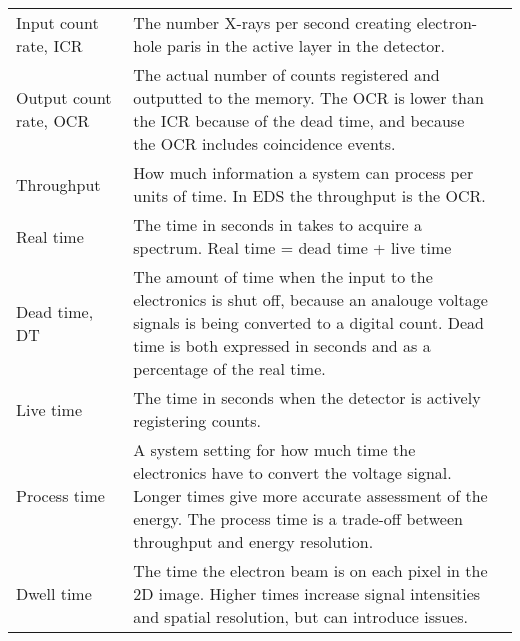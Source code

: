 \begin{table}[pht]
\begin{center}
\begin{tabular}{p{2.6cm}p{10cm}l}
            Input count rate, ICR             & The number X-rays per second creating electron-hole paris in the active layer in the detector.                                                                                                                             &                    \\
            Output count rate, OCR            & The actual number of counts registered and outputted to the memory. The OCR is lower than the ICR because of the dead time, and because the OCR includes coincidence events.                                               &                    \\
            Throughput                        & How much information a system can process per units of time. In EDS the throughput is the OCR.                                                                                                                             &                    \\
            Real time                         & The time in seconds in takes to acquire a spectrum. Real time = dead time + live time                                                                                                                                      &                    \\
            Dead time, DT                     & The amount of time when the input to the electronics is shut off, because an analouge voltage signals is being converted to a digital count. Dead time is both expressed in seconds and as a percentage of the real time.  &                    \\
            Live time                         & The time in seconds when the detector is actively registering counts.                                                                                                                                                      &                    \\
            Process time                      & A system setting for how much time the electronics have to convert the voltage signal. Longer times give more accurate assessment of the energy. The process time is a trade-off between throughput and energy resolution. &                    \\
            Dwell time                        & The time the electron beam is on each pixel in the 2D image. Higher times increase signal intensities and spatial resolution, but can introduce issues.                                                                    &                    \\
            \hline
        \end{tabular}
    \end{center}
\end{table}